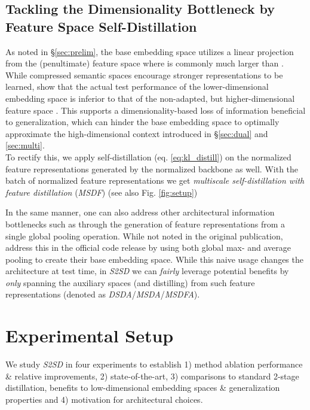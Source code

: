 \documentclass{article} \usepackage{arxiv_style,times}
\begin{document}
\subsection{Tackling the Dimensionality Bottleneck by Feature Space Self-Distillation}\label{sec:feats}
As noted in \S\ref{sec:prelim}, the base embedding space  utilizes a linear projection  from the (penultimate) feature space  where  is commonly much larger than . While compressed semantic spaces encourage stronger representations \citep{alex2016deep,dai2019diagnosing} to be learned, \citet{milbich2020sharing} show that the actual test performance of the lower-dimensional embedding space  is inferior to that of the non-adapted, but higher-dimensional feature space . This supports a dimensionality-based loss of information beneficial to generalization, which can hinder the base embedding space to optimally approximate the high-dimensional context introduced in \S\ref{sec:dual} and \ref{sec:multi}.\\
To rectify this, we apply self-distillation (eq. \ref{eq:kl_distill}) on the normalized feature representations  generated by the normalized backbone  as well. 
With the batch of normalized feature representations  we get \emph{multiscale self-distillation with feature distillation} (\textit{MSDF}) (see also Fig.  \ref{fig:setup})

In the same manner, one can also address other architectural information bottlenecks such as through the generation of feature representations from a single global pooling operation. While not noted in the original publication, \cite{kim2020proxy} address this in the official code release by using both global max- and average pooling to create their base embedding space. While this naive usage changes the architecture at test time, in \textit{S2SD} we can \textit{fairly} leverage potential benefits by \textit{only} spanning the auxiliary spaces (and distilling) from such feature representations (denoted as \textit{DSDA}/\textit{MSDA}/\textit{MSDFA}).




\section{Experimental Setup}\label{sec:experiments}
We study \textit{S2SD} in four experiments to establish 1) method ablation performance \& relative improvements, 2) state-of-the-art, 3) comparisons to standard 2-stage distillation, benefits to low-dimensional embedding spaces \& generalization properties and 4) motivation for architectural choices.
\end{document}
